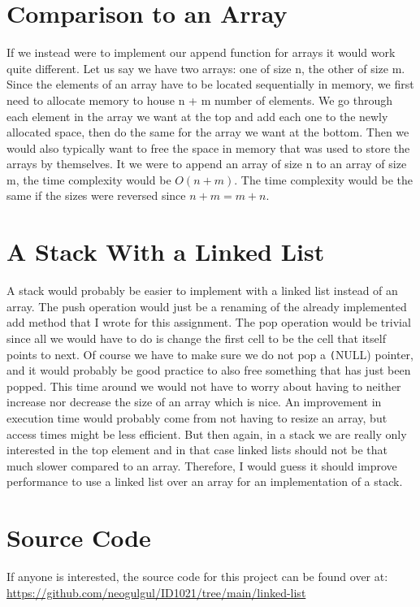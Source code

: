 \documentclass[a4paper, 11pt]{article}
\begin{document}
\section{Comparison to an Array}
	If we instead were to implement our append function for arrays it would work quite different.
	Let us say we have two arrays: one of size n, the other of size m.
	Since the elements of an array have to be located sequentially in memory, we first need to allocate memory to house n + m number of elements.
	We go through each element in the array we want at the top and add each one to the newly allocated space, then do the same for the array we want at the bottom.
	Then we would also typically want to free the space in memory that was used to store the arrays by themselves.
	It we were to append an array of size n to an array of size m, the time complexity would be \(O(n+m)\).
	The time complexity would be the same if the sizes were reversed since \(n+m = m+n\).

\section{A Stack With a Linked List}
	A stack would probably be easier to implement with a linked list instead of an array.
	The push operation would just be a renaming of the already implemented add method that I wrote for this assignment.
	The pop operation would be trivial since all we would have to do is change the first cell to be the cell that itself points to next.
	Of course we have to make sure we do not pop a \texttt(NULL) pointer, and it would probably be good practice to also free something that has just been popped.
	This time around we would not have to worry about having to neither increase nor decrease the size of an array which is nice.
	An improvement in execution time would probably come from not having to resize an array,
	but access times might be less efficient.
	But then again, in a stack we are really only interested in the top element and in that case linked lists should not be that much slower compared to an array.
	Therefore, I would guess it should improve performance to use a linked list over an array for an implementation of a stack.

\section{Source Code}
	If anyone is interested, the source code for this project can be found over at:
	\url{https://github.com/neogulgul/ID1021/tree/main/linked-list}
\end{document}
